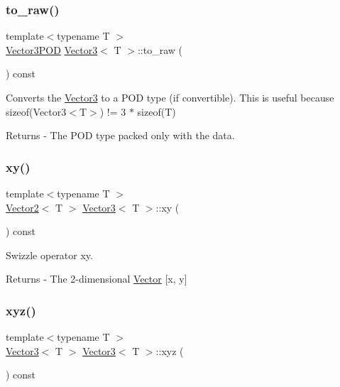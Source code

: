 \subsubsection{\texorpdfstring{to\+\_\+raw()}{to\_raw()}}
{\footnotesize\ttfamily template$<$typename T $>$ \\
\mbox{\hyperlink{struct_vector3_p_o_d}{Vector3\+P\+OD}} \mbox{\hyperlink{class_vector3}{Vector3}}$<$ T $>$\+::to\+\_\+raw (\begin{DoxyParamCaption}{ }\end{DoxyParamCaption}) const}

Converts the \mbox{\hyperlink{class_vector3}{Vector3}} to a P\+OD type (if convertible). This is useful because sizeof(\+Vector3$<$\+T$>$) != 3 $\ast$ sizeof(\+T) \begin{DoxyReturn}{Returns}
-\/ The P\+OD type packed only with the data. 
\end{DoxyReturn}
\mbox{\label{class_vector3_ae129388b328e1989ae6fe671fb0f73eb}} 
\subsubsection{\texorpdfstring{xy()}{xy()}}
{\footnotesize\ttfamily template$<$typename T $>$ \\
\mbox{\hyperlink{class_vector2}{Vector2}}$<$ T $>$ \mbox{\hyperlink{class_vector3}{Vector3}}$<$ T $>$\+::xy (\begin{DoxyParamCaption}{ }\end{DoxyParamCaption}) const}

Swizzle operator xy. \begin{DoxyReturn}{Returns}
-\/ The 2-\/dimensional \mbox{\hyperlink{class_vector}{Vector}} \mbox{[}x, y\mbox{]} 
\end{DoxyReturn}
\mbox{\label{class_vector3_a19844da39de7a26862856c7d12a009ca}} 
\subsubsection{\texorpdfstring{xyz()}{xyz()}}
{\footnotesize\ttfamily template$<$typename T $>$ \\
\mbox{\hyperlink{class_vector3}{Vector3}}$<$ T $>$ \mbox{\hyperlink{class_vector3}{Vector3}}$<$ T $>$\+::xyz (\begin{DoxyParamCaption}{ }\end{DoxyParamCaption}) const}

